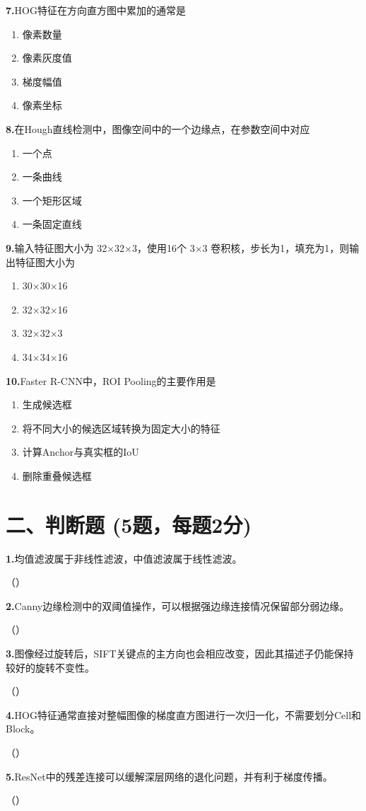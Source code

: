 \documentclass[UTF8,openany,oneside,zihao=-4,fontset=windows]{ctexbook}
\newcommand{\Question}[2]{%
  \par\Needspace{4\baselineskip}\medskip
  \noindent\textbf{\color{MVBlue}#1}\quad #2\par
}
\newenvironment{choices}{\begin{enumerate}[label=\Alph*.,itemsep=0.15em,topsep=0.25em,leftmargin=3em]}{\end{enumerate}}
\begin{document}
\Question{7.}{HOG特征在方向直方图中累加的通常是}
\begin{choices}
\item 像素数量
\item 像素灰度值
\item 梯度幅值
\item 像素坐标
\end{choices}
\Question{8.}{在Hough直线检测中，图像空间中的一个边缘点，在参数空间中对应}
\begin{choices}
\item 一个点
\item 一条曲线
\item 一个矩形区域
\item 一条固定直线
\end{choices}
\Question{9.}{输入特征图大小为 32×32×3，使用16个 3×3 卷积核，步长为1，填充为1，则输出特征图大小为}
\begin{choices}
\item 30×30×16
\item 32×32×16
\item 32×32×3
\item 34×34×16
\end{choices}
\Question{10.}{Faster R-CNN中，ROI Pooling的主要作用是}
\begin{choices}
\item 生成候选框
\item 将不同大小的候选区域转换为固定大小的特征
\item 计算Anchor与真实框的IoU
\item 删除重叠候选框
\end{choices}
\section{二、判断题 (5题，每题2分)}
\Question{1.}{均值滤波属于非线性滤波，中值滤波属于线性滤波。}
\par\noindent\hfill（\hspace{2em}）\par
\Question{2.}{Canny边缘检测中的双阈值操作，可以根据强边缘连接情况保留部分弱边缘。}
\par\noindent\hfill（\hspace{2em}）\par
\Question{3.}{图像经过旋转后，SIFT关键点的主方向也会相应改变，因此其描述子仍能保持较好的旋转不变性。}
\par\noindent\hfill（\hspace{2em}）\par
\Question{4.}{HOG特征通常直接对整幅图像的梯度直方图进行一次归一化，不需要划分Cell和Block。}
\par\noindent\hfill（\hspace{2em}）\par
\Question{5.}{ResNet中的残差连接可以缓解深层网络的退化问题，并有利于梯度传播。}
\par\noindent\hfill（\hspace{2em}）\par
\end{document}
